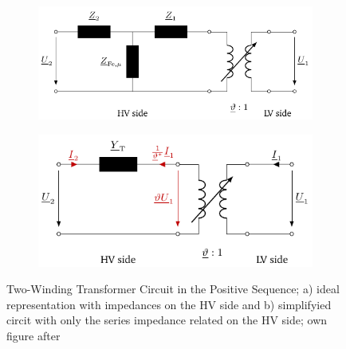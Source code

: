 \begin{figure}%
    \centering
    \captionsetup[subfigure]{justification=centering} 
    \begin{subfigure}[c]{.53\textwidth}
        \centering
        \includegraphics[width=\linewidth]{tikz_graphics/images/transformer_complete.pdf}
        \caption{}
    \end{subfigure}
    \begin{subfigure}[c]{.46\textwidth}
        \centering
        \includegraphics[width=\linewidth]{tikz_graphics/images/transformer_reduced.pdf}
        \caption{}
    \end{subfigure}
    \caption[Two-Winding Transformer Circuit in the Positive Sequence]{Two-Winding Transformer Circuit in the Positive Sequence; a) ideal representation with impedances on the \acs{HV} side and b) simplifyied circit with only the series impedance related on the \acs{HV} side; own figure after \autocite{machowskiPowerSystemDynamics2020,kundurPowerSystemStability2022,milanoPowerSystemModelling2010}}
    \label{fig:trafo-model}
\end{figure}

